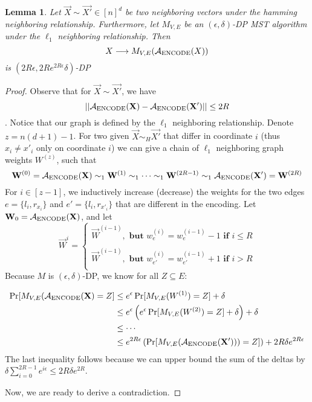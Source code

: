 \documentclass{article}
\newtheorem{lemma}[theorem]{Lemma}
\begin{document}
\begin{lemma}
Let $\vec{X} \sim \vec{X'}\in [n]^d$ be two neighboring vectors under the hamming neighboring relationship.
Furthermore, let $M_{V,E}$ be an $(\epsilon, \delta)$-DP MST algorithm under the $\ell_1$ neighboring relationship.
Then
\[
X \longrightarrow M_{V,E}(\mathcal{A}_{\textrm{ENCODE}}(X))
\]
is $(2R\epsilon, 2Re^{2R\epsilon}\delta)$-DP
\end{lemma}
\begin{proof}
Observe that for $\vec{X}\sim \vec{X'}$, we have 
\[
||\mathcal{A}_{\mathrm{ENCODE}}(\mathbf{X}) - \mathcal{A}_{\mathrm{ENCODE}}(\mathbf{X'})|| \leq 2R
\].
Notice that our graph is defined by the $\ell_1$ neighboring relationship. 
Denote $z = n(d+1)-1$.
For two given $\vec{X} \sim_H \vec{X'}$ that differ in coordinate $i$ (thus $x_i \neq x'_i$ only on coordinate $i$) we can give a chain of $\ell_1$ neighboring graph weights $W^{(z)}$, such that 
\[
\mathbf{W}^{(0)} =\mathcal{A}_{\mathrm{ENCODE}}(\mathbf{X}) \sim_1 \mathbf{W}^{(1)} \sim_1 \cdots \sim_1 \mathbf{W}^{(2R-1)} \sim_1  \mathcal{A}_{\mathrm{ENCODE}}(\mathbf{X'}) = \mathbf{W}^{(2R)}
\]
For $i\in [z-1]$, we inductively increase (decrease) the weights for the two edges $e = \{l_i, r_{x_i}\}$ and $e' = \{l_i, r_{x'_i}\}$ that are different in the encoding.
Let $\mathbf{W}_0 = \mathcal{A}_{\textrm{ENCODE}}(\mathbf{X})$, and let
\[\vec{W}^i = \begin{cases}
    \vec{W}^{(i-1)}, \textbf{~but~} w^{(i)}_{e} = w^{(i-1)}_{e}- 1 \textbf{~if~} i\leq R\\
    \\
    \vec{W}^{(i-1)}, \textbf{~but~} w^{(i)}_{e'} = w^{(i-1)}_{e'} +  1 \textbf{~if~} i > R\\
\end{cases}
\]
Because $M$ is $(\epsilon, \delta)$-DP, we know for all $Z\subseteq E$:

\begin{align*}
\Pr[M_{V,E}(\mathcal{A}_{\textrm{ENCODE}}(\mathbf{X}) = Z] &\leq e^\epsilon \Pr[M_{V,E}(W^{(1)}) = Z] + \delta\\
& \leq e^\epsilon \left( e^\epsilon \Pr[M_{V,E}(W^{(2)}) = Z] + \delta \right) + \delta\\
& \leq \cdots \\
& \leq e^{2R\epsilon} \left(\Pr[M_{V,E}(\mathcal{A}_{\mathrm{ENCODE}}(\mathbf{X'}))) = Z] \right) +2R \delta e^{2R\epsilon}\\
\end{align*}
The last inequality follows because we can upper bound the sum of the deltas by  $\delta \sum\limits_{i = 0}^{2R-1} e^{i\epsilon}\leq 2R\delta e^{2R}$.

Now, we are ready to derive a contradiction.
\end{proof}
\end{document}
